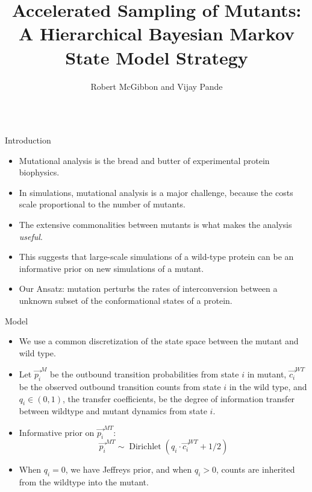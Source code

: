 \documentclass[final]{beamer}
\title{Accelerated Sampling of Mutants: A Hierarchical Bayesian Markov State Model Strategy}
\author{Robert McGibbon and Vijay Pande}
\institute[Stanford University]{Department of Chemistry, Stanford University, Stanford, CA.}
\begin{document}
\begin{frame}{}%
  \vspace{-1.2in}
  \begin{columns}[t]


\begin{column}{.3\linewidth}

\begin{block}{Introduction}
  \begin{itemize}
  \item Mutational analysis is the bread and butter of experimental protein biophysics.
  \item In simulations, mutational analysis is a major challenge, because the costs scale proportional to the number of mutants.
  \item The extensive commonalities between mutants is what makes the analysis \emph{useful}.
  \item This suggests that large-scale simulations of a wild-type protein can be an \alert{informative prior} on new simulations of a mutant.
  \item Our Ansatz: mutation perturbs the rates of interconversion between a unknown subset of the conformational states of a protein.
  \end{itemize}
\end{block}
\vspace{0.5in}

\begin{block}{Model}
\begin{itemize}
    \item We use a common discretization of the state space between the mutant and wild type.

    \item Let $\vec{p_i}^{M}$ be the outbound transition probabilities from state $i$ in mutant, $\vec{c_i}^{WT}$ be the observed outbound transition counts from state $i$ in the wild type, and $q_i \in (0, 1)$, the transfer coefficients, be the degree of information transfer between wildtype and mutant dynamics from state $i$.

    \item \alert{Informative prior} on $\vec{p_i}^{MT}$:
    $$ \vec{p_i}^{MT} \sim \operatorname{Dirichlet}(q_i \cdot \vec{c_i}^{WT} + 1/2) $$
    \item When $q_i=0$, we have Jeffreys prior, and when $q_i > 0$, counts are \alert{inherited} from the wildtype into the mutant.
    

\end{itemize}
\end{block}
\end{column}
\end{columns}
\end{frame}
\end{document}
